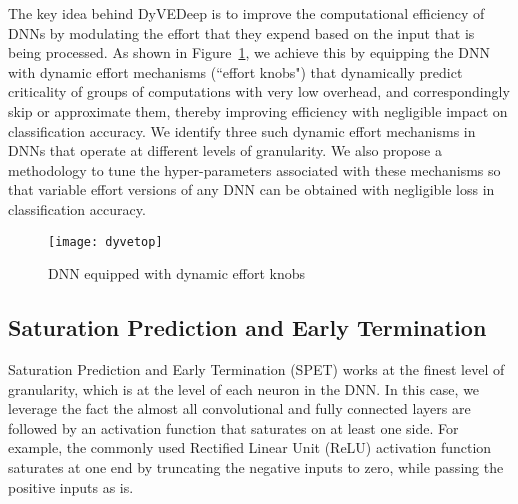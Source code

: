 \documentclass{article} %
\begin{document}
The key idea behind DyVEDeep is to improve the computational efficiency of DNNs by modulating the effort that they expend based on the input that is being processed. As shown in Figure~\ref{fig:dyvedeepTop}, we achieve this by equipping the DNN with dynamic effort mechanisms (``effort knobs") that dynamically predict criticality of groups of computations with very low overhead, and correspondingly skip or approximate them, thereby improving efficiency with negligible impact on classification accuracy. We identify three such dynamic effort mechanisms in DNNs that operate at different levels of granularity. We also propose a methodology to tune the hyper-parameters associated with these mechanisms so that variable effort versions of any DNN can be obtained with negligible loss in classification accuracy.

\begin{figure}[htb]
\centering 
\texttt{[image: dyvetop]}
\caption{DNN equipped with dynamic effort knobs}
\label{fig:dyvedeepTop}
\end{figure}

\subsection{Saturation Prediction and Early Termination}
Saturation Prediction and Early Termination (SPET) works at the finest level of granularity, which is at the level of each neuron in the DNN. In this case, we leverage the fact the almost all convolutional and fully connected layers are followed by an activation function that saturates on at least one side. For example, the commonly used Rectified Linear Unit (ReLU) activation function saturates at one end by truncating the negative inputs to zero, while passing the positive inputs as is. 
\end{document}
